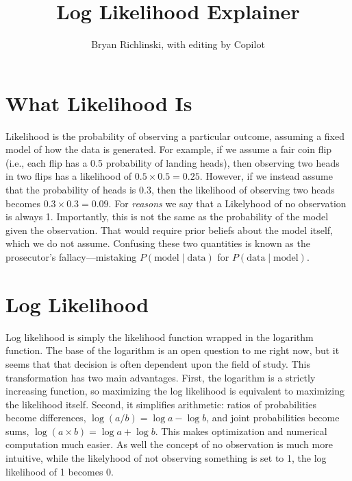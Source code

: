 \documentclass[12pt]{article}
\title{Log Likelihood Explainer}
\author{Bryan Richlinski, with editing by Copilot}
\begin{document}
\maketitle

\section*{What Likelihood Is}

Likelihood is the probability of observing a particular outcome, assuming a fixed model of how the data is generated.  
%  
For example, if we assume a fair coin flip (i.e., each flip has a 0.5 probability of landing heads), then observing two heads in two flips has a likelihood of \( 0.5 \times 0.5 = 0.25 \).  
%  
However, if we instead assume that the probability of heads is 0.3, then the likelihood of observing two heads becomes \( 0.3 \times 0.3 = 0.09 \).  
%
For \emph{reasons} we say that a Likelyhood of no observation is always 1. 
%  
Importantly, this is not the same as the probability of the model given the observation.  
%  
That would require prior beliefs about the model itself, which we do not assume.  
%  
Confusing these two quantities is known as the prosecutor's fallacy—mistaking \( P(\text{model} \mid \text{data}) \) for \( P(\text{data} \mid \text{model}) \).  
%  


\section*{Log Likelihood}

Log likelihood is simply the likelihood function wrapped in the logarithm function.
%
The base of the logarithm is an open question to me right now, but it seems that that decision is often dependent upon the field of study. 
%
This transformation has two main advantages.  
%  
First, the logarithm is a strictly increasing function, so maximizing the log likelihood is equivalent to maximizing the likelihood itself.  
%  
Second, it simplifies arithmetic: ratios of probabilities become differences, \( \log(a/b) = \log a - \log b \), and joint probabilities become sums, \( \log(a \times b) = \log a + \log b \).  
%  
This makes optimization and numerical computation much easier.  
%  
As well the concept of no observation is much more intuitive, while the likelyhood of not observing something is set to 1, the log likelihood of 1 becomes 0. 
%  
\end{document}
